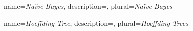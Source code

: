 



{
  name=\textit{Na{\"i}ve Bayes},
  description={},
  plural=\textit{Na{\"i}ve Bayes}
}

{
  name=\textit{Hoeffding Tree},
  description={},
  plural=\textit{Hoeffding Trees}
}












